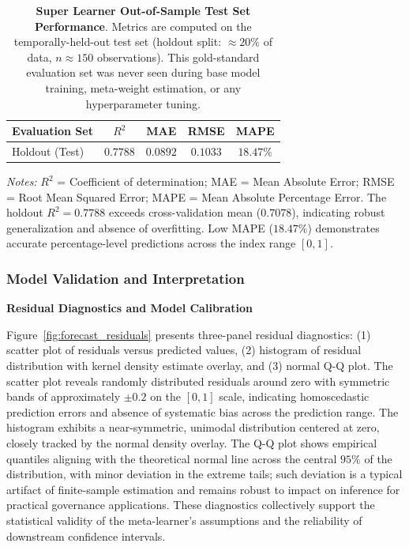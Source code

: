 \documentclass[12pt,a4paper]{article}
\begin{document}
\begin{table}[H]
\centering
\caption{%
    \textbf{Super Learner Out-of-Sample Test Set Performance}.
    Metrics are computed on the temporally-held-out test set (holdout split: $\approx 20\%$ of data, $n \approx 150$ observations).
    This gold-standard evaluation set was never seen during base model training, meta-weight estimation, or any hyperparameter tuning.
}
\label{tab:holdout_performance}
\small
\begin{tabular}{lcccc}
\toprule
\textbf{Evaluation Set} & $R^2$ & MAE & RMSE & MAPE \\
\midrule
Holdout (Test)         & $0.7788$ & $0.0892$ & $0.1033$ & $18.47\%$ \\
\bottomrule
\end{tabular}
\begin{flushleft}
\footnotesize
\textit{Notes:} 
$R^2$ = Coefficient of determination; MAE = Mean Absolute Error; RMSE = Root Mean Squared Error; 
MAPE = Mean Absolute Percentage Error.
The holdout $R^2 = 0.7788$ exceeds cross-validation mean ($0.7078$), indicating robust generalization and absence of overfitting.
Low MAPE ($18.47\%$) demonstrates accurate percentage-level predictions across the index range $[0, 1]$.
\end{flushleft}
\end{table}

\FloatBarrier

\subsubsection{Model Validation and Interpretation}

\textbf{Residual Diagnostics and Model Calibration}

Figure~\ref{fig:forecast_residuals} presents three-panel residual diagnostics: (1) scatter plot of residuals versus predicted values, (2) histogram of residual distribution with kernel density estimate overlay, and (3) normal Q-Q plot. The scatter plot reveals randomly distributed residuals around zero with symmetric bands of approximately $\pm 0.2$ on the $[0,1]$ scale, indicating homoscedastic prediction errors and absence of systematic bias across the prediction range. The histogram exhibits a near-symmetric, unimodal distribution centered at zero, closely tracked by the normal density overlay. The Q-Q plot shows empirical quantiles aligning with the theoretical normal line across the central $95\%$ of the distribution, with minor deviation in the extreme tails; such deviation is a typical artifact of finite-sample estimation and remains robust to impact on inference for practical governance applications. These diagnostics collectively support the statistical validity of the meta-learner's assumptions and the reliability of downstream confidence intervals.
\end{document}
